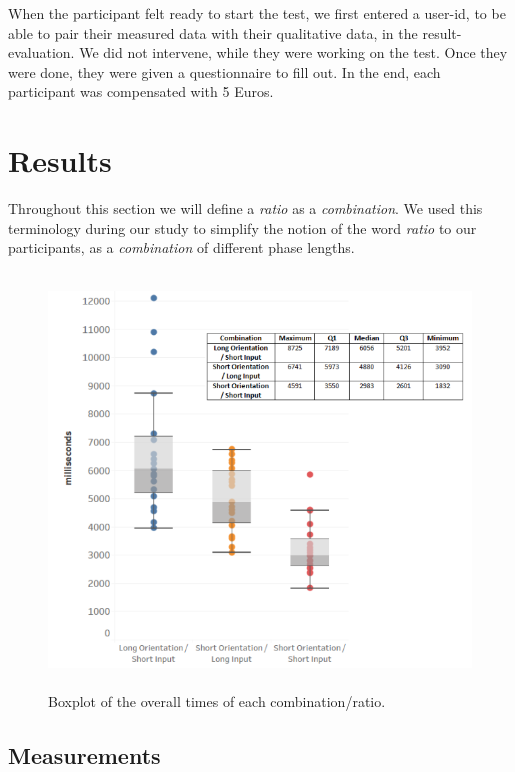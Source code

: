 When the participant felt ready to start the test, we first entered a user-id, to be able to pair their measured data with their qualitative data, in the result-evaluation. We did not intervene, while they were working on the test. Once they were done, they were given a questionnaire to fill out. In the end, each participant was compensated with 5 Euros.



\section{Results} \label{5.4}

Throughout this section we will define a \textit{ratio} as a \textit{combination}. We used this terminology during our study to simplify the notion of the word \textit{ratio} to our participants, as a \textit{combination} of different phase lengths.

\begin{figure}[t!]
\centering
\includegraphics[width=13cm, height=11cm]{Chapters/graphics/Combinations.png}
\caption{Boxplot of the overall times of each combination/ratio.}
\label{fig:combination}
\end{figure}

\subsection{Measurements}

